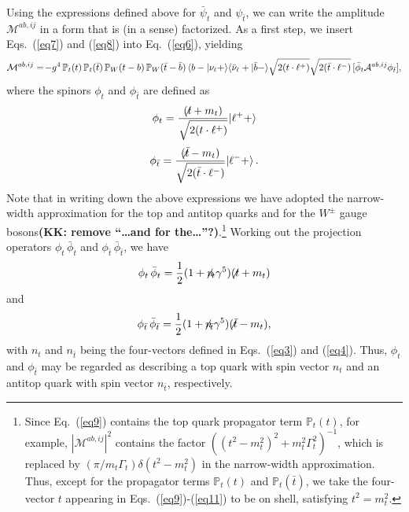 \documentclass[aps,preprint,tightenlines,floatfix,superscriptaddress,nofootinbib,showpacs]{revtex4-1}
\def\beq{\begin{equation}}
\def\eeq{\end{equation}}
\def\tbslash{\tbar\hspace{-10pt}\not{}\hspace{4pt}}
\def\tslash{t\hspace{-10pt}\not{}\hspace{4pt}}
\def\nslash{n\hspace{-10pt}\not{}\hspace{4pt}}
\def\tbar{\bar{t}}
\def\bbar{\bar{b}}
\def\nubar{{\bar{\nu}}_{\ell}}
\begin{document}
Using the expressions defined above for $\bar{\psi}_t$ and
$\psi_{\tbar}$, we can write the amplitude $\mathcal{M}^{ab,ij}$
in a form that is (in a sense) factorized.
As a first step, we insert
Eqs.~(\ref{eq7}) and (\ref{eq8}) into Eq.~(\ref{eq6}), yielding
%
\beq
\label{eq9}
\mathcal{M}^{ab,ij}=\!-g^4\,\mathbb{P}_t(t)\,\mathbb{P}_t(\tbar)\,\mathbb{P}_W(t-b)\,\mathbb{P}_W(\tbar-\bbar)\,\langle b-|\nu_{\ell}+\rangle \langle\nubar+|\bbar-\rangle \sqrt{\strut2(t\cdot {\ell}^+)}\sqrt{\strut2(\tbar\cdot {\ell}^-)}\,[\bar{\phi}_t \mathcal{A}^{ab,ij}\phi_{\tbar}],
\eeq
%
where the spinors $\phi_{t}$ and $\phi_{\tbar}$ are defined as
%
\beq
\label{eq10}
\phi_t=\frac{(\tslash +m_t)}{\sqrt{\strut2(t\cdot {\ell}^+)}}|{\ell}^++\rangle
\eeq
%
\beq
\label{eq11}
\phi_{\tbar}=\frac{(\tbslash -m_t)}{\sqrt{\strut2(\tbar\cdot {\ell}^-)}}|{\ell}^-+\rangle \,.
\eeq
%
Note that in writing down the above expressions we have adopted the narrow-width
approximation for the top and antitop quarks and for the $W^\pm$ gauge
bosons{\bf (KK: remove ``\ldots and for the\ldots''?)}.\footnote{Since Eq.~(\ref{eq9}) contains the top quark propagator
  term
  $\mathbb{P}_t(t)$, for example, $|\mathcal{M}^{ab,ij}|^2$ contains
  the factor $((t^2-m^2_t)^2+m^2_t\Gamma^2_t)^{-1}$,
  which is replaced by $(\pi/m_t\Gamma_t)\delta(t^2-m^2_t)$
  in the narrow-width approximation.  Thus, except for the propagator terms $\mathbb{P}_t(t)$ and $\mathbb{P}_t(\tbar)$,
   we take the four-vector $t$ appearing in Eqs.~(\ref{eq9})-(\ref{eq11}) to be
  on shell, satisfying $t^2 = m_t^2$.} 
Working out the projection operators $\phi_t\,\bar{\phi}_t$
and $\phi_{\tbar}\,\bar{\phi}_{\tbar}$, we have
%
\beq
\label{eq12}
\phi_t\,\bar{\phi}_t=\frac{1}{2}(1+\nslash_{\!t}\gamma^5)(\tslash +m_t)
\eeq
%
and
%
\beq
\label{eq13}
\phi_{\tbar}\,\bar{\phi}_{\tbar}=\frac{1}{2}(1+\nslash_{\!\tbar}\gamma^5)(\tbslash -m_t),
\eeq
%
with $n_t$ and $n_{\tbar}$ being the four-vectors defined in
Eqs.~(\ref{eq3}) and (\ref{eq4}).  Thus, $\phi_t$ and $\phi_{\tbar}$
may be regarded as
describing a top quark with spin vector $n_t$ and an antitop quark
with spin vector $n_{\tbar}$, respectively.
\end{document}
